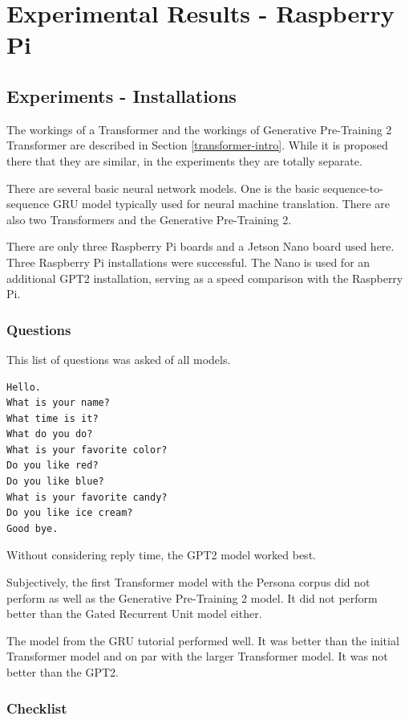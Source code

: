 \chapter{Experimental Results - Raspberry Pi}

\label{experiments-installations}

\section{Experiments - Installations}
The workings of a Transformer and the workings of Generative Pre-Training 2 Transformer are described in Section \ref{transformer-intro}. While it is proposed there that they are similar, in the experiments they are totally separate.

There are several basic neural network models. One is the basic sequence-to-sequence GRU model typically used for neural machine translation. There are also two Transformers and the Generative Pre-Training 2.  

There are only three Raspberry Pi boards and a Jetson Nano board used here. Three Raspberry Pi installations were successful. The Nano is used for an additional GPT2 installation, serving as a speed comparison with the Raspberry Pi. 


\subsection{Questions}
This list of questions was asked of all models. 

\begin{verbatim}
Hello.
What is your name? 
What time is it?
What do you do?
What is your favorite color?
Do you like red?
Do you like blue?
What is your favorite candy?
Do you like ice cream?
Good bye.
\end{verbatim}

Without considering reply time, the GPT2 model worked best. 

Subjectively, the first Transformer model with the Persona corpus did not perform as well as the Generative Pre-Training 2 model. It did not perform better than the Gated Recurrent Unit model either. 

The model from the GRU tutorial performed well. It was better than the initial Transformer model and on par with the larger Transformer model. It was not better than the GPT2.

\subsection{Checklist} 

